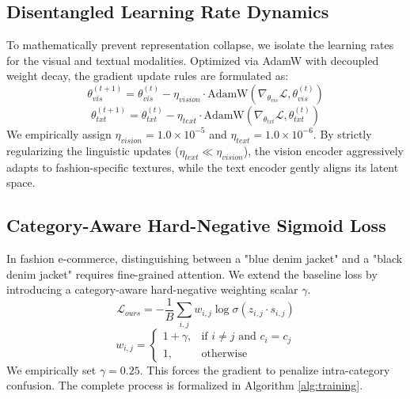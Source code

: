 \documentclass[12pt, a4paper]{article}
\begin{document}
\subsection{Disentangled Learning Rate Dynamics}
To mathematically prevent representation collapse, we isolate the learning rates for the visual and textual modalities. Optimized via AdamW with decoupled weight decay, the gradient update rules are formulated as:
\begin{equation}
    \theta_{vis}^{(t+1)} = \theta_{vis}^{(t)} - \eta_{vision} \cdot \text{AdamW}(\nabla_{\theta_{vis}} \mathcal{L}, \theta_{vis}^{(t)})
    \label{eq:update_vis}
\end{equation}
\begin{equation}
    \theta_{txt}^{(t+1)} = \theta_{txt}^{(t)} - \eta_{text} \cdot \text{AdamW}(\nabla_{\theta_{txt}} \mathcal{L}, \theta_{txt}^{(t)})
    \label{eq:update_txt}
\end{equation}
We empirically assign $\eta_{vision} = 1.0 \times 10^{-5}$ and $\eta_{text} = 1.0 \times 10^{-6}$. By strictly regularizing the linguistic updates ($\eta_{text} \ll \eta_{vision}$), the vision encoder aggressively adapts to fashion-specific textures, while the text encoder gently aligns its latent space.

\subsection{Category-Aware Hard-Negative Sigmoid Loss}
In fashion e-commerce, distinguishing between a "blue denim jacket" and a "black denim jacket" requires fine-grained attention. We extend the baseline loss by introducing a category-aware hard-negative weighting scalar $\gamma$. 
\begin{equation}
    \mathcal{L}_{ours} = - \frac{1}{B} \sum_{i,j} w_{i,j} \log \sigma(z_{i,j} \cdot s_{i,j})
    \label{eq:loss_ours}
\end{equation}
\begin{equation}
w_{i,j} = \begin{cases} 1 + \gamma, & \text{if } i \neq j \text{ and } c_i = c_j \\ 1, & \text{otherwise} \end{cases}
\label{eq:weight_scalar}
\end{equation}
We empirically set $\gamma = 0.25$. This forces the gradient to penalize intra-category confusion. The complete process is formalized in Algorithm \ref{alg:training}.
\end{document}
